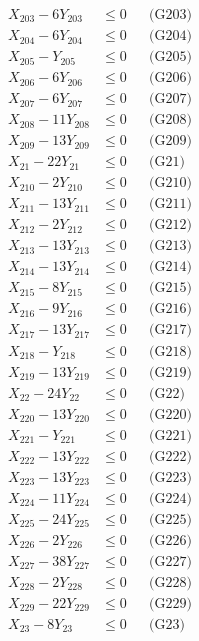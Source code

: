 \documentclass[a4paper,10pt]{article}
\begin{document}
{\begin{align}
X_{203} - 6Y_{203} &\leq 0 && \text{(G203)} \\
X_{204} - 6Y_{204} &\leq 0 && \text{(G204)} \\
X_{205} - Y_{205} &\leq 0 && \text{(G205)} \\
\allowbreak
X_{206} - 6Y_{206} &\leq 0 && \text{(G206)} \\
X_{207} - 6Y_{207} &\leq 0 && \text{(G207)} \\
X_{208} - 11Y_{208} &\leq 0 && \text{(G208)} \\
X_{209} - 13Y_{209} &\leq 0 && \text{(G209)} \\
X_{21} - 22Y_{21} &\leq 0 && \text{(G21)} \\
X_{210} - 2Y_{210} &\leq 0 && \text{(G210)} \\
X_{211} - 13Y_{211} &\leq 0 && \text{(G211)} \\
X_{212} - 2Y_{212} &\leq 0 && \text{(G212)} \\
X_{213} - 13Y_{213} &\leq 0 && \text{(G213)} \\
X_{214} - 13Y_{214} &\leq 0 && \text{(G214)} \\
X_{215} - 8Y_{215} &\leq 0 && \text{(G215)} \\
X_{216} - 9Y_{216} &\leq 0 && \text{(G216)} \\
X_{217} - 13Y_{217} &\leq 0 && \text{(G217)} \\
X_{218} - Y_{218} &\leq 0 && \text{(G218)} \\
X_{219} - 13Y_{219} &\leq 0 && \text{(G219)} \\
X_{22} - 24Y_{22} &\leq 0 && \text{(G22)} \\
X_{220} - 13Y_{220} &\leq 0 && \text{(G220)} \\
X_{221} - Y_{221} &\leq 0 && \text{(G221)} \\
X_{222} - 13Y_{222} &\leq 0 && \text{(G222)} \\
X_{223} - 13Y_{223} &\leq 0 && \text{(G223)} \\
\allowbreak
X_{224} - 11Y_{224} &\leq 0 && \text{(G224)} \\
X_{225} - 24Y_{225} &\leq 0 && \text{(G225)} \\
X_{226} - 2Y_{226} &\leq 0 && \text{(G226)} \\
X_{227} - 38Y_{227} &\leq 0 && \text{(G227)} \\
X_{228} - 2Y_{228} &\leq 0 && \text{(G228)} \\
X_{229} - 22Y_{229} &\leq 0 && \text{(G229)} \\
X_{23} - 8Y_{23} &\leq 0 && \text{(G23)} \\

\end{align}}
\end{document}
